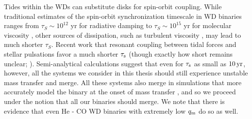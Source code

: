 Tides within the WDs can substitute disks for spin-orbit coupling.  While traditional estimates of the spin-orbit synchronization timescale in WD binaries ranges from $\tau_{S} \sim 10^{12}$ yr for radiative damping to $\tau_{S} \sim 10^{15}$ yr for molecular viscosity \citep{marsns04}, other sources of dissipation, such as turbulent viscosity \citep{mochl89}, may lead to much shorter $\tau_{S}$.  Recent work \citep{fulll12, burk+13, fulll14} that resonant coupling between tidal forces and stellar pulsations favor a much shorter $\tau_\mathrm{s}$ (though exactly how short remains unclear; \citealt{fulll14}).  Semi-analytical calculations \citep{marsns04,gokhpf07, kermsk15} suggest that even for $\tau_\mathrm{s}$ as small as $10\,\mathrm{yr}$, however, all the systems we consider in this thesis should still experience unstable mass transfer and merge.  All these systems also merge in simulations that more accurately model the binary at the onset of mass transfer \citep{dan+11, dan+12}, and so we proceed under the notion that all our binaries should merge.  We note that there is evidence \citep{shen15, brow+16} that even He - CO WD binaries with extremely low $\qm$ do so as well.




